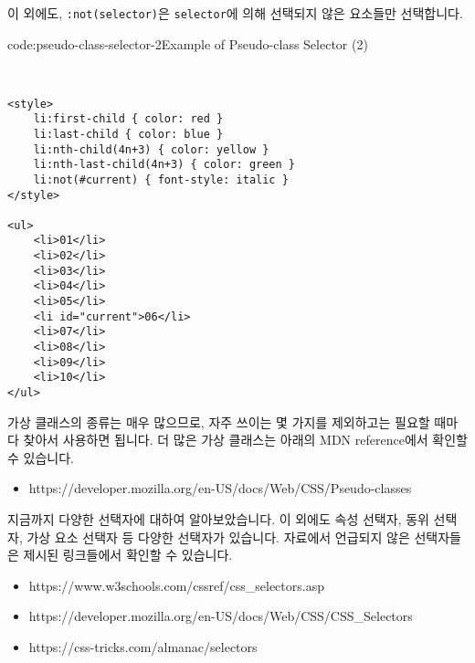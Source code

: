 이 외에도, \verb|:not(selector)|은 \verb|selector|에 의해 선택되지 않은 요소들만 선택합니다.

\begin{codeenv}{code:pseudo-class-selector-2}{Example of Pseudo-class Selector (2)}\begin{verbatim}


<style>
    li:first-child { color: red }
    li:last-child { color: blue }
    li:nth-child(4n+3) { color: yellow }
    li:nth-last-child(4n+3) { color: green }
    li:not(#current) { font-style: italic }
</style>

<ul>
    <li>01</li>
    <li>02</li>
    <li>03</li>
    <li>04</li>
    <li>05</li>
    <li id="current">06</li>
    <li>07</li>
    <li>08</li>
    <li>09</li>
    <li>10</li>
</ul>
\end{verbatim}
\end{codeenv}

가상 클래스의 종류는 매우 많으므로, 자주 쓰이는 몇 가지를 제외하고는 필요할 때마다 찾아서 사용하면 됩니다. 더 많은 가상 클래스는 아래의 MDN reference에서 확인할 수 있습니다. 

\begin{itemize}
    \item https://developer.mozilla.org/en-US/docs/Web/CSS/Pseudo-classes
\end{itemize}

지금까지 다양한 선택자에 대하여 알아보았습니다. 이 외에도 속성 선택자, 동위 선택자, 가상 요소 선택자 등 다양한 선택자가 있습니다. 자료에서 언급되지 않은 선택자들은 제시된 링크들에서 확인할 수 있습니다. 

\begin{itemize}
    \item https://www.w3schools.com/cssref/css\_selectors.asp
    \item https://developer.mozilla.org/en-US/docs/Web/CSS/CSS\_Selectors
    \item https://css-tricks.com/almanac/selectors
\end{itemize}
